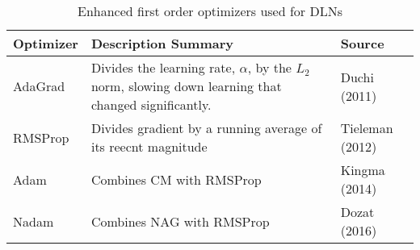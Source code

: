\begin{table}[H]
\centering
\caption{Enhanced first order optimizers used for DLNs}
\label{tb-optimizers}
\scriptsize
\begin{tabular}{@{}p{2cm}p{8cm}p{2.5cm}@{}}
\toprule
\textbf{Optimizer} & \textbf{Description Summary} & \textbf{Source} \\ \midrule
AdaGrad & Divides the learning rate, $\alpha$, by the $L_{2}$ norm, slowing down learning that changed significantly. & Duchi (2011) \\
RMSProp & Divides gradient by a running average of its reecnt magnitude & Tieleman (2012) \\
Adam & Combines CM with RMSProp & Kingma (2014) \\
Nadam & Combines NAG with RMSProp & Dozat (2016) \\ \bottomrule
\end{tabular}
\end{table}